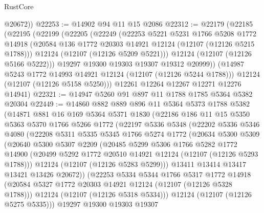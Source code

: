 \begin{lexlean}{RustCore}
\begin{coremodule}
        @20672))
@22253 := @14902 @94 @11 @15 @2086
@22312 := @22179
    (@22185
      (@22195
        (@22199
          (@22205
            (@22249
              (@22253
                @5221
                @5231
                @1766
                @5208
                @1772
                @14918
                (@20584 @136 @1772 @20303 @14921 @12124 (@12107 (@12126 @5215 @1788)))
                @12124
                (@12107 (@12126 @5209 @5221)))
              @12124
              (@12107 (@12126 @5166 @5222)))
            @19297
            @19300
            @19303
            @19307
            @19312
            @20999))
        (@14987 @5243 @1772 @14993 @14921 @12124 (@12107 (@12126 @5244 @1788)))
        @12124
        (@12107 (@12126 @5158 @5250)))
      @12261
      @12264
      @12267
      @12271
      @12276
      @14941)
@22321 := @14947 @5260 @91 @897 @11 @1788 @1785 @5364 @5382 @20304
@22449 := @14860
    @882
    @889
    @896
    @11
    @5364
    @5373
    @1788
    @5382
    (@14871
      @881
      @16
      @169
      @5364
      @5371
      @1830
      (@22186
        @186
        @11
        @15
        @5350
        @5363
        @5370
        @1766
        @5266
        @1772
        (@22197
          @5336
          @5348
          (@22202
            @5336
            @5346
            @4080
            (@22208
              @5311
              @5335
              @5345
              @1766
              @5274
              @1772
              (@20634
                @5300
                @5309
                (@20640
                  @5300
                  @5307
                  @2209
                  (@20485
                    @5299
                    @5306
                    @1766
                    @5282
                    @1772
                    @14900
                    (@20499 @5292 @1772 @20510 @14921 @12124 (@12107 (@12126 @5293 @1788)))
                    @12124
                    (@12107 (@12126 @5283 @5299)))
                  @13411
                  @13414
                  @13417
                  @13421
                  @13426
                  @20672))
              (@22253
                @5334
                @5344
                @1766
                @5317
                @1772
                @14918
                (@20584 @5327 @1772 @20303 @14921 @12124 (@12107 (@12126 @5328 @1788)))
                @12124
                (@12107 (@12126 @5318 @5334)))
              @12124
              (@12107 (@12126 @5275 @5335)))
            @19297
            @19300
            @19303
            @19307

\end{coremodule}
\end{lexlean}
